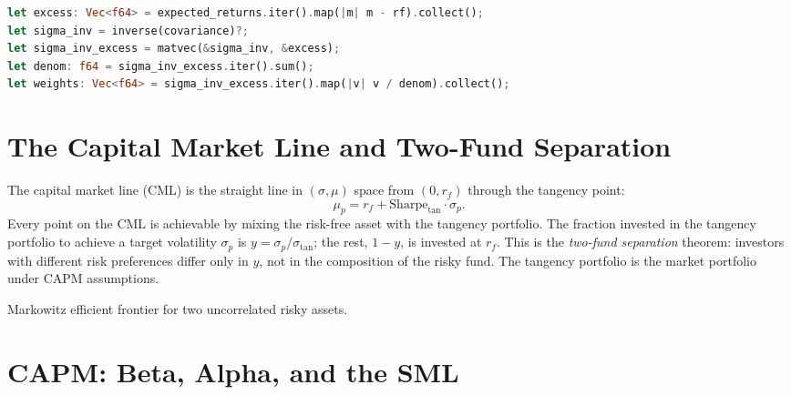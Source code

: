 \begin{lstlisting}[language=Rust]
let excess: Vec<f64> = expected_returns.iter().map(|m| m - rf).collect();
let sigma_inv = inverse(covariance)?;
let sigma_inv_excess = matvec(&sigma_inv, &excess);
let denom: f64 = sigma_inv_excess.iter().sum();
let weights: Vec<f64> = sigma_inv_excess.iter().map(|v| v / denom).collect();
\end{lstlisting}

\section{The Capital Market Line and Two-Fund Separation}


The capital market line (CML) is the straight line in $(\sigma, \mu)$
space from $(0, r_f)$ through the tangency point:
\[
\mu_p = r_f + \text{Sharpe}_{\text{tan}} \cdot \sigma_p.
\]
Every point on the CML is achievable by mixing the risk-free asset with
the tangency portfolio. The fraction invested in the tangency portfolio
to achieve a target volatility $\sigma_p$ is $y = \sigma_p / \sigma_{\tan}$;
the rest, $1 - y$, is invested at $r_f$. This is the
\emph{two-fund separation} theorem: investors with different risk
preferences differ only in $y$, not in the composition of the risky
fund. The tangency portfolio is the market portfolio under CAPM
assumptions.

\begin{marginfigure}
    \centering
    \vspace{-3cm}
    
    \caption{Markowitz efficient frontier for two uncorrelated risky assets.}
    \label{fig:efficient-frontier}
\end{marginfigure}

\section{CAPM: Beta, Alpha, and the SML}


